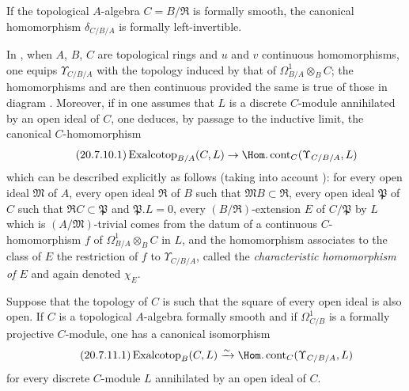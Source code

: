 \begin{corollary}[20.7.9]
\label{0.20.7.9}
If the topological $A$-algebra $C=B/\mathfrak{R}$ is formally smooth, the canonical homomorphism $\delta_{C/B/A}$ is formally left-invertible.
\end{corollary}

\begin{env}[20.7.10]
\label{0.20.7.10}
In , when $A$, $B$, $C$ are topological rings and $u$ and $v$ continuous homomorphisms, one equips $\Upsilon_{C/B/A}$ with the topology induced by that of $\Omega^1_{B/A}\otimes_B C$; the homomorphisms  and  are then continuous provided the same is true of those in diagram . Moreover, if in  one assumes that $L$ is a discrete $C$-module annihilated by an open ideal of $C$, one deduces, by passage to the inductive limit, the canonical $C$-homomorphism
\begin{equation}
\tag{20.7.10.1}
  \label{0.20.7.10.1}
  \operatorname{Exalcotop}_{B/A}(C,L)\to\Hom.\operatorname{cont}_C(\Upsilon_{C/B/A},L)
\end{equation}
which can be described explicitly as follows (taking into account ): for every open ideal $\mathfrak{M}$ of $A$, every open ideal $\mathfrak{R}$ of $B$ such that $\mathfrak{M}B\subset\mathfrak{R}$, every open ideal $\mathfrak{P}$ of $C$ such that $\mathfrak{R}C\subset\mathfrak{P}$ and $\mathfrak{P}.L=0$, every $(B/\mathfrak{R})$-extension $E$ of $C/\mathfrak{P}$ by $L$ which is $(A/\mathfrak{M})$-trivial comes from the datum of a continuous $C$-homomorphism $f$ of $\Omega^1_{B/A}\otimes_B C$ in $L$, and the homomorphism  associates to the class of $E$ the restriction of $f$ to $\Upsilon_{C/B/A}$, called the \emph{characteristic homomorphism of $E$} and again denoted $\chi_E$.
\end{env}

\begin{proposition}[20.7.11]
\label{0.20.7.11}
Suppose that the topology of $C$ is such that the square of every open ideal is also open.
If $C$ is a topological $A$-algebra formally smooth and if $\Omega^1_{C/B}$ is a formally projective $C$-module, one has a canonical isomorphism
\begin{equation}
\tag{20.7.11.1}
  \label{0.20.7.11.1}
  \operatorname{Exalcotop}_B(C,L)\xrightarrow{\sim}\Hom.\operatorname{cont}_C(\Upsilon_{C/B/A},L)
\end{equation}
for every discrete $C$-module $L$ annihilated by an open ideal of $C$.
\end{proposition}

